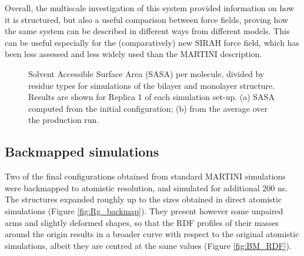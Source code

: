 Overall, the multiscale investigation of this system provided information on how it is structured, but also a useful comparison between force fields, proving how the same system can be described in different ways from different models. This can be useful especially for the (comparatively) new SIRAH force field, which has been less assessed and less widely used than the MARTINI description.
%
\begin{figure}[t!]
\centering
{} 
\caption[SASA per residue of monolayer and bilater]{Solvent Accessible Surface Area (SASA) per molecule, divided by residue types for simulations of the bilayer and monolayer structure. Results are shown for Replica 1 of each simulation set-up. (a) SASA computed from the initial configuration; (b) from the average over the production run.}
\label{fig:mono_bi_sasa}
\end{figure}


\subsection{Backmapped simulations} 

Two of the final configurations obtained from standard MARTINI simulations were backmapped to atomistic resolution, and simulated for additional 200 ns. The structures expanded roughly up to the sizes obtained in direct atomistic simulations (Figure \ref{fig:Rg_backmap}). They present however some unpaired arms and slightly deformed shapes, so that the RDF profiles of their masses around the origin results in a broader curve with respect to the original atomistic simulations, albeit they are centred at the same values (Figure \ref{fig:BM_RDF}).


